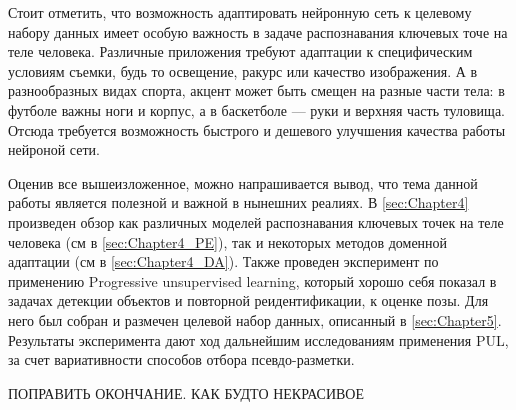 Стоит отметить, что возможность адаптировать нейронную сеть к целевому набору данных имеет особую важность в задаче распознавания ключевых точе на теле человека. Различные приложения требуют адаптации к специфическим условиям съемки, будь то освещение, ракурс или качество изображения. А в разнообразных видах спорта, акцент может быть смещен на разные части тела: в футболе важны ноги и корпус, а в баскетболе — руки и верхняя часть туловища. Отсюда требуется возможность быстрого и дешевого улучшения качества работы нейроной сети. 

Оценив все вышеизложенное, можно напрашивается вывод, что тема данной работы является полезной и важной в нынешних реалиях. В \autoref{sec:Chapter4} произведен обзор как различных моделей распознавания ключевых точек на теле человека (см в \autoref{sec:Chapter4_PE}), так и некоторых методов доменной адаптации (см в \autoref{sec:Chapter4_DA}). Также проведен эксперимент по применению Progressive unsupervised learning, который хорошо себя показал в задачах детекции объектов и повторной реидентификации, к оценке позы. Для него был собран и размечен целевой набор данных, описанный в \autoref{sec:Chapter5}. Результаты эксперимента дают ход дальнейшим исследованиям применения PUL, за счет вариативности способов отбора псевдо-разметки.

ПОПРАВИТЬ ОКОНЧАНИЕ. КАК БУДТО НЕКРАСИВОЕ

\newpage